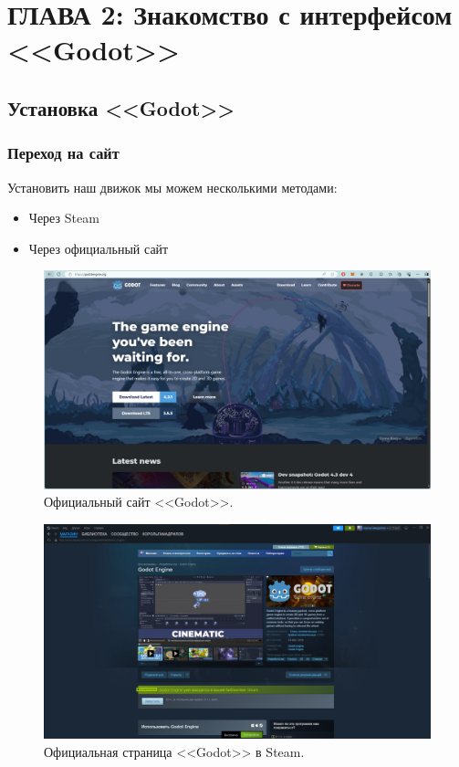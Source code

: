 \chapter{\label{ch:ch02}ГЛАВА 2: Знакомство с интерфейсом <<Godot>>}

\section{\label{sec:ch02/sec01}Установка <<Godot>>}

\subsection{\label{subsec:ch02/sec01/sub01}Переход на сайт}
Установить наш движок мы можем несколькими методами:
\begin{itemize}
    \item Через Steam
    \item Через официальный сайт
\end{itemize}


\begin{figure}[h]
    \centering
    \includegraphics[width=1\textwidth]{images/godotsait.png}
\caption{\centering\label{fig:example03}Официальный сайт <<Godot>>.}
\end{figure}


\begin{figure}[h]
    \centering
    \includegraphics[width=1\textwidth]{images/godotSteam.png}
\caption{\centering\label{fig:example04}Официальная страница <<Godot>> в Steam.}
\end{figure}


